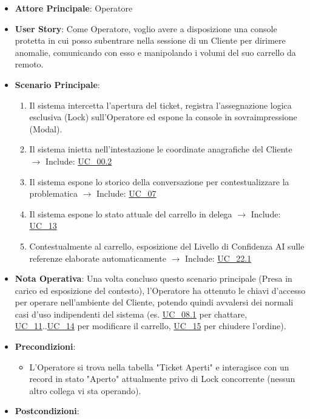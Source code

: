 \begin{itemize}
    \item \textbf{Attore Principale}: Operatore
    \item \textbf{User Story}: Come Operatore, voglio avere a disposizione una console protetta in cui posso subentrare nella sessione di un Cliente per dirimere anomalie, comunicando con esso e manipolando i volumi del suo carrello da remoto.
    \item \textbf{Scenario Principale}: 
    \begin{enumerate}
        \item Il sistema intercetta l'apertura del ticket, registra l'assegnazione logica esclusiva (Lock) sull'Operatore ed espone la console in sovraimpressione (Modal).
        \item Il sistema inietta nell'intestazione le coordinate anagrafiche del Cliente $\rightarrow$ Include: \hyperref[uc_00.2]{UC\_00.2}
        \item Il sistema espone lo storico della conversazione per contestualizzare la problematica $\rightarrow$ Include: \hyperref[uc_07]{UC\_07}
        \item Il sistema espone lo stato attuale del carrello in delega $\rightarrow$ Include: \hyperref[uc_13]{UC\_13}
        \item Contestualmente al carrello, esposizione del Livello di Confidenza AI sulle referenze elaborate automaticamente $\rightarrow$ Include: \hyperref[uc_22.1]{UC\_22.1}
    \end{enumerate}
    \item \textbf{Nota Operativa}: Una volta concluso questo scenario principale (Presa in carico ed esposizione del contesto), l'Operatore ha ottenuto le chiavi d'accesso per operare nell'ambiente del Cliente, potendo quindi avvalersi dei normali casi d'uso indipendenti del sistema (es. \hyperref[uc_08.1]{UC\_08.1} per chattare, \hyperref[uc_11]{UC\_11}..\hyperref[uc_14]{UC\_14} per modificare il carrello, \hyperref[uc_15]{UC\_15} per chiudere l'ordine).
    \item \textbf{Precondizioni}:
    \begin{itemize}
        \item L'Operatore si trova nella tabella "Ticket Aperti" e interagisce con un record in stato "Aperto" attualmente privo di Lock concorrente (nessun altro collega vi sta operando).
    \end{itemize}
    \item \textbf{Postcondizioni}:
    \begin{itemize}

\end{itemize}
\end{itemize}

